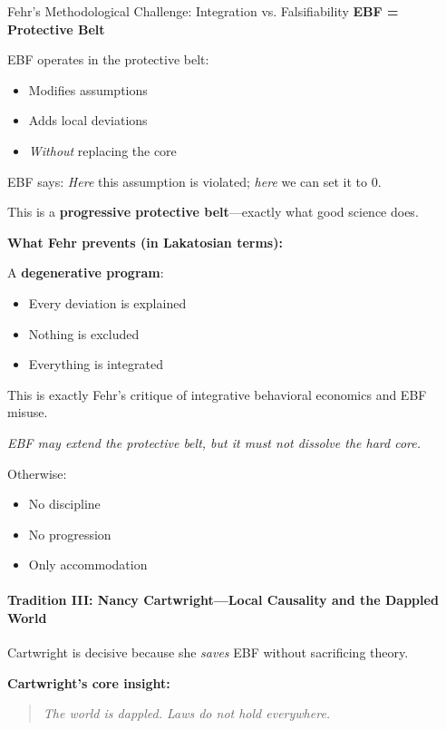 \begin{chapter}{Fehr's Methodological Challenge: Integration vs. Falsifiability}
\textbf{EBF = Protective Belt}

EBF operates in the protective belt:
\begin{itemize}[noitemsep]
    \item Modifies assumptions
    \item Adds local deviations
    \item \textit{Without} replacing the core
\end{itemize}

EBF says: \textit{Here} this assumption is violated; \textit{here} we can set it to 0.

This is a \textbf{progressive protective belt}---exactly what good science does.

\textbf{What Fehr prevents (in Lakatosian terms):}

A \textbf{degenerative program}:
\begin{itemize}[noitemsep]
    \item Every deviation is explained
    \item Nothing is excluded
    \item Everything is integrated
\end{itemize}

This is exactly Fehr's critique of integrative behavioral economics and EBF misuse.

\begin{tcolorbox}[colback=orange!5!white,colframe=orange!75!black,title=\textbf{Fehr's Position in Lakatos's Language}]
\textit{EBF may extend the protective belt, but it must not dissolve the hard core.}

Otherwise:
\begin{itemize}[noitemsep]
    \item No discipline
    \item No progression
    \item Only accommodation
\end{itemize}
\end{tcolorbox}

\paragraph{Tradition III: Nancy Cartwright---Local Causality and the Dappled World}

Cartwright is decisive because she \textit{saves} EBF without sacrificing theory.

\textbf{Cartwright's core insight:}
\begin{quote}
\textit{The world is dappled. Laws do not hold everywhere.}
\end{quote}


\end{chapter}
